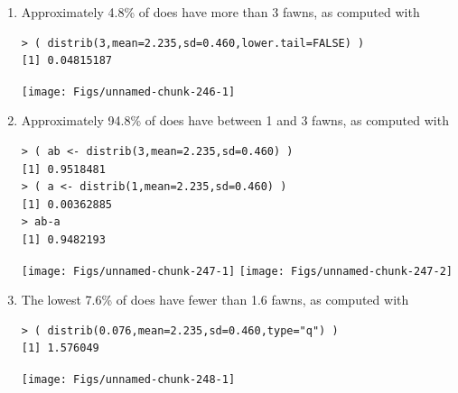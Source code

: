 \documentclass[10pt,openany]{book}\usepackage[]{graphicx}\usepackage[]{color}
\makeatletter
\newenvironment{kframe}{%
 \def\at@end@of@kframe{}%
 \ifinner\ifhmode%
  \def\at@end@of@kframe{\end{minipage}}%
  \begin{minipage}{\columnwidth}%
 \fi\fi%
 \def\FrameCommand##1{\hskip\@totalleftmargin \hskip-\fboxsep
 \colorbox{shadecolor}{##1}\hskip-\fboxsep
     \hskip-\linewidth \hskip-\@totalleftmargin \hskip\columnwidth}%
 \MakeFramed {\advance\hsize-\width
   \@totalleftmargin\z@ \linewidth\hsize
   \@setminipage}}%
 {\par\unskip\endMakeFramed%
 \at@end@of@kframe}
\newenvironment{knitrout}{}{} %
\makeatother
\begin{document}
\begin{itemize}
\begin{enumerate}
\begin{knitrout}
{}



\end{knitrout}
      \item Approximately 4.8\% of does have more than 3 fawns, as computed with
\begin{knitrout}
\color{fgcolor}\begin{kframe}
\begin{verbatim}
> ( distrib(3,mean=2.235,sd=0.460,lower.tail=FALSE) )
[1] 0.04815187
\end{verbatim}
\end{kframe}

{\centering \texttt{[image: Figs/unnamed-chunk-246-1]} 

}



\end{knitrout}
      \item Approximately 94.8\% of does have between 1 and 3 fawns, as computed with
\begin{knitrout}
\color{fgcolor}\begin{kframe}
\begin{verbatim}
> ( ab <- distrib(3,mean=2.235,sd=0.460) )
[1] 0.9518481
> ( a <- distrib(1,mean=2.235,sd=0.460) )
[1] 0.00362885
> ab-a
[1] 0.9482193
\end{verbatim}
\end{kframe}

{\centering \texttt{[image: Figs/unnamed-chunk-247-1]} 
\texttt{[image: Figs/unnamed-chunk-247-2]} 

}



\end{knitrout}
      \item The lowest 7.6\% of does have fewer than 1.6 fawns, as computed with
\begin{knitrout}
\color{fgcolor}\begin{kframe}
\begin{verbatim}
> ( distrib(0.076,mean=2.235,sd=0.460,type="q") )
[1] 1.576049
\end{verbatim}
\end{kframe}

{\centering \texttt{[image: Figs/unnamed-chunk-248-1]} 

}




\end{knitrout}
\end{enumerate}
\end{itemize}
\end{document}
